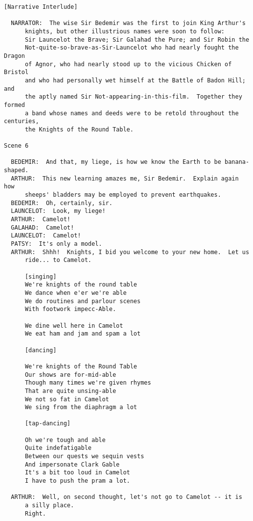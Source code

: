 \documentclass{article}
\begin{document}
\begin{verbatim}
[Narrative Interlude]

  NARRATOR:  The wise Sir Bedemir was the first to join King Arthur's
      knights, but other illustrious names were soon to follow:
      Sir Launcelot the Brave; Sir Galahad the Pure; and Sir Robin the
      Not-quite-so-brave-as-Sir-Launcelot who had nearly fought the Dragon
      of Agnor, who had nearly stood up to the vicious Chicken of Bristol
      and who had personally wet himself at the Battle of Badon Hill; and
      the aptly named Sir Not-appearing-in-this-film.  Together they formed
      a band whose names and deeds were to be retold throughout the centuries,
      the Knights of the Round Table.

Scene 6

  BEDEMIR:  And that, my liege, is how we know the Earth to be banana-shaped.
  ARTHUR:  This new learning amazes me, Sir Bedemir.  Explain again how
      sheeps' bladders may be employed to prevent earthquakes.
  BEDEMIR:  Oh, certainly, sir.
  LAUNCELOT:  Look, my liege!
  ARTHUR:  Camelot!
  GALAHAD:  Camelot!
  LAUNCELOT:  Camelot!
  PATSY:  It's only a model.
  ARTHUR:  Shhh!  Knights, I bid you welcome to your new home.  Let us
      ride... to Camelot.

      [singing]
      We're knights of the round table
      We dance when e'er we're able
      We do routines and parlour scenes
      With footwork impecc-Able.

      We dine well here in Camelot
      We eat ham and jam and spam a lot

      [dancing]

      We're knights of the Round Table
      Our shows are for-mid-able
      Though many times we're given rhymes
      That are quite unsing-able
      We not so fat in Camelot
      We sing from the diaphragm a lot

      [tap-dancing]

      Oh we're tough and able
      Quite indefatigable
      Between our quests we sequin vests
      And impersonate Clark Gable
      It's a bit too loud in Camelot
      I have to push the pram a lot.

  ARTHUR:  Well, on second thought, let's not go to Camelot -- it is
      a silly place.
      Right.


\end{verbatim}
\end{document}
